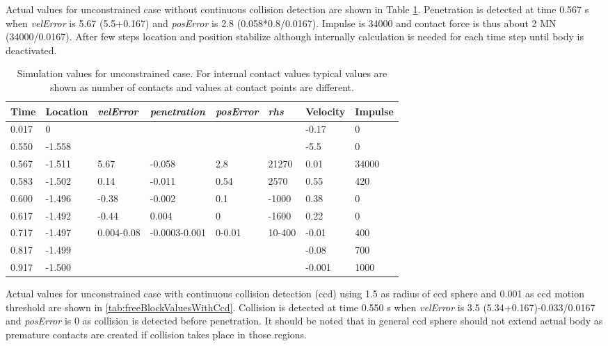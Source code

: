 Actual values for unconstrained case without continuous collision detection
are shown in Table \ref{tab:freeBlockValues}. Penetration is detected at time 0.567 s when
{\it velError} is 5.67 (5.5+0.167) and
{\it posError} is 2.8 (0.058*0.8/0.0167). Impulse is 34000 and contact force is thus about 2 MN (34000/0.0167).
After few steps location and position stabilize although internally calculation is needed for each time step
until body is deactivated.

\begin {table}[htb!]
\caption {Simulation values for unconstrained case. 
For internal contact values typical values are shown
as number of contacts and values at contact points are different.} 
\label{tab:freeBlockValues} 
\begin{center}
\begin{tabular}{|l| l|l| l|l|l|l|l|}
\hline
{\bf Time} & 
{\bf Location} &
{\it velError} & {\it penetration} & {\it posError} & {\it rhs} &
{\bf Velocity} & 
{\bf Impulse} \\  \hline
0.017 &  0 & & & &  &-0.17 & 0 \\  \hline
0.550 &  -1.558 & & & & & -5.5 & 0 \\  \hline
0.567 &  -1.511 & 5.67 &-0.058 &2.8 &  21270 & 0.01 & 34000 \\  \hline
0.583 &  -1.502 & 0.14 &-0.011 & 0.54& 2570  & 0.55 & 420 \\  \hline
0.600 &  -1.496 & -0.38&-0.002 & 0.1  & -1000& 0.38 & 0 \\  \hline
0.617 &  -1.492 &-0.44 & 0.004 & 0     & -1600& 0.22 & 0 \\  \hline
0.717 &  -1.497 &0.004-0.08  &-0.0003-0.001 &0-0.01 & 10-400 & -0.01 & 400 \\  \hline
0.817 &  -1.499 & & & & & -0.08 & 700 \\  \hline
0.917 &  -1.500 & & & & & -0.001 & 1000 \\  \hline
\end {tabular}
\end{center}
\end {table}

Actual values for unconstrained case with continuous collision detection (ccd) using 1.5 
as radius of ccd sphere and 0.001 as ccd motion threshold
are shown in \ref{tab:freeBlockValuesWithCcd}. Collision is detected at time 0.550 s when
{\it velError} is  3.5 (5.34+0.167)-0.033/0.0167 and
{\it posError} is  0 as collision is detected before penetration. 
It should be noted that in general ccd sphere should not extend actual body as 
premature contacts are created if collision takes place in those regions.


